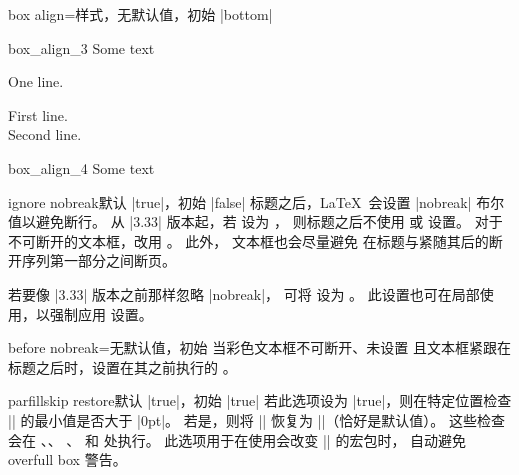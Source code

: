 \begin{docTcbKey}[][doc new=2014-10-10]{box align}{=}{样式，无默认值，初始 |bottom|}
\begin{exdispExample}{box_align_3}
Some text\dotfill
\begin{tcolorbox}[box align=center]
One line.
\end{tcolorbox}
\begin{tcolorbox}[box align=center]
First line.\\Second line.
\end{tcolorbox}
\end{exdispExample}

\begin{exdispExample}{box_align_4}
Some text\dotfill
{}
\end{exdispExample}
\end{docTcbKey}




\begin{docTcbKey}[][doc new=2014-12-11]{ignore nobreak}{}{默认 |true|，初始 |false|}
标题之后，\LaTeX\ 会设置 |nobreak| 布尔值以避免断行。
从 |3.33| 版本起，若  设为 ，
则标题之后不使用  或  设置。
对于不可断开的文本框，改用 。
此外， 文本框也会尽量避免
在标题与紧随其后的断开序列第一部分之间断页。

若要像 |3.33| 版本之前那样忽略 |nobreak|，
可将  设为 。
此设置也可在局部使用，以强制应用  设置。
\end{docTcbKey}

\begin{docTcbKey}[][doc new=2014-12-16]{before nobreak}{=}{无默认值，初始 }
  当彩色文本框不可断开、未设置 
  且文本框紧跟在标题之后时，设置在其之前执行的 。
\end{docTcbKey}


\begin{docTcbKey}[][doc new=2017-02-23]{parfillskip restore}{}{默认 |true|，初始 |true|}
  若此选项设为 |true|，则在特定位置检查 |\parfillskip| 的最小值是否大于 |0pt|。
  若是，则将 |\parfillskip| 恢复为 |\@flushglue|（恰好是默认值）。
  这些检查会在 、、
  、 和  处执行。
  此选项用于在使用会改变 |\parfillskip| 的宏包时，
  自动避免 overfull box 警告。
\end{docTcbKey}



